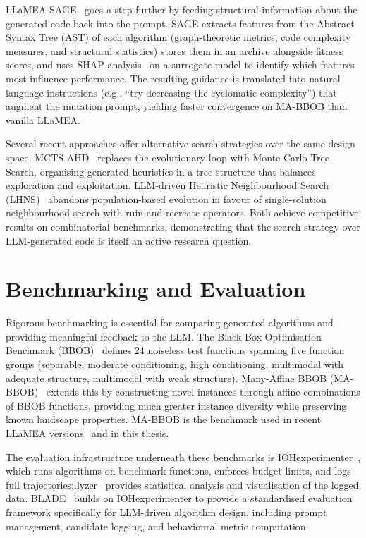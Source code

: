 LLaMEA-SAGE~\cite{vanStein2026LLaMEASAGE} goes a step further by feeding structural information about the generated code back into the prompt. SAGE extracts features from the Abstract Syntax Tree (AST) of each algorithm (graph-theoretic metrics, code complexity measures, and structural statistics) stores them in an archive alongside fitness scores, and uses SHAP analysis~\cite{lundberg2017shap} on a surrogate model to identify which features most influence performance. The resulting guidance is translated into natural-language instructions (e.g., ``try decreasing the cyclomatic complexity'') that augment the mutation prompt, yielding faster convergence on MA-BBOB than vanilla LLaMEA.

Several recent approaches offer alternative search strategies over the same design space. MCTS-AHD~\cite{zheng2025mctsahd} replaces the evolutionary loop with Monte Carlo Tree Search, organising generated heuristics in a tree structure that balances exploration and exploitation. LLM-driven Heuristic Neighbourhood Search (LHNS)~\cite{xie2025lhns} abandons population-based evolution in favour of single-solution neighbourhood search with ruin-and-recreate operators. Both achieve competitive results on combinatorial benchmarks, demonstrating that the search strategy over LLM-generated code is itself an active research question.

\section{Benchmarking and Evaluation}
\label{sec:bg-benchmarking}

Rigorous benchmarking is essential for comparing generated algorithms and providing meaningful feedback to the LLM. The Black-Box Optimisation Benchmark (BBOB)~\cite{hansen2021coco} defines 24 noiseless test functions spanning five function groups (separable, moderate conditioning, high conditioning, multimodal with adequate structure, multimodal with weak structure). Many-Affine BBOB (MA-BBOB)~\cite{vermetten2023mabbob} extends this by constructing novel instances through affine combinations of BBOB functions, providing much greater instance diversity while preserving known landscape properties. MA-BBOB is the benchmark used in recent LLaMEA versions~\cite{vanStein2026LLaMEASAGE} and in this thesis.

The evaluation infrastructure underneath these benchmarks is IOHexperimenter~\cite{deNobel2024iohexperimenter}, which runs algorithms on benchmark functions, enforces budget limits, and logs full trajectories;.lyzer~\cite{wang2022iohanalyzer} provides statistical analysis and visualisation of the logged data. BLADE~\cite{vanStein2025BLADE} builds on IOHexperimenter to provide a standardised evaluation framework specifically for LLM-driven algorithm design, including prompt management, candidate logging, and behavioural metric computation.

